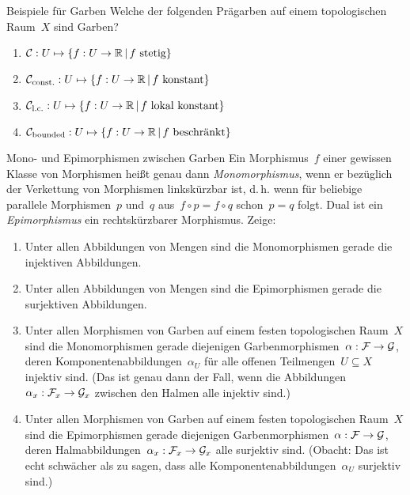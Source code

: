 \documentclass{uebblatt}
\begin{document}

\begin{aufgabe}{Beispiele für Garben}
Welche der folgenden Prägarben auf einem topologischen Raum~$X$ sind Garben?
\begin{enumerate}
\item $\mathcal{C} : U \mapsto \{ f : U \to \mathbb{R} \,|\, \text{$f$ stetig} \}$
\item $\mathcal{C}_\text{const.} : U \mapsto \{ f : U \to \mathbb{R} \,|\, \text{$f$ konstant} \}$
\item $\mathcal{C}_\text{l.c.} : U \mapsto \{ f : U \to \mathbb{R} \,|\, \text{$f$ lokal konstant} \}$
\item $\mathcal{C}_\text{bounded} : U \mapsto \{ f : U \to \mathbb{R} \,|\, \text{$f$ beschränkt} \}$
\end{enumerate}
\end{aufgabe}

\begin{aufgabe}{Mono- und Epimorphismen zwischen Garben}
Ein Morphismus~$f$ einer gewissen Klasse von Morphismen heißt genau dann
\emph{Monomorphismus}, wenn er bezüglich der Verkettung von Morphismen
linkskürzbar ist, d.\,h. wenn für beliebige parallele Morphismen~$p$ und~$q$
aus~$f \circ p = f \circ q$ schon~$p = q$ folgt. Dual ist
ein \emph{Epimorphismus} ein rechtskürzbarer Morphismus. Zeige:
\begin{enumerate}
\item Unter allen Abbildungen von Mengen sind die Monomorphismen gerade die
injektiven Abbildungen.
\item Unter allen Abbildungen von Mengen sind die Epimorphismen gerade die
surjektiven Abbildungen.
\item Unter allen Morphismen von Garben auf einem festen topologischen Raum~$X$
sind die Monomorphismen gerade
diejenigen Garbenmorphismen~$\alpha : \mathcal{F} \to \mathcal{G}$, deren
Komponentenabbildungen~$\alpha_U$ für alle offenen Teilmengen~$U \subseteq X$
injektiv sind. (Das ist genau dann der Fall, wenn die Abbildungen~$\alpha_x :
\mathcal{F}_x \to \mathcal{G}_x$ zwischen den Halmen alle injektiv sind.)
\item Unter allen Morphismen von Garben auf einem festen topologischen Raum~$X$
sind die Epimorphismen gerade
diejenigen Garbenmorphismen~$\alpha : \mathcal{F} \to \mathcal{G}$, deren
Halmabbildungen~$\alpha_x : \mathcal{F}_x \to \mathcal{G}_x$ alle surjektiv sind. (Obacht: Das
ist echt schwächer als zu sagen, dass alle Komponentenabbildungen~$\alpha_U$
surjektiv sind.)
\end{enumerate}
\end{aufgabe}
\end{document}
